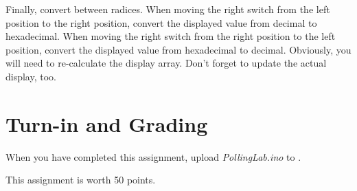 Finally, convert between radices. When moving the right switch from the left
position to the right position, convert the displayed value from decimal to
hexadecimal. When moving the right switch from the right position to the left
position, convert the displayed value from hexadecimal to decimal. Obviously,
you will need to re-calculate the display array. Don't forget to update the
actual display, too.

\section*{Turn-in and Grading}

When you have completed this assignment, upload \textit{PollingLab.ino} to
\filesubmission.

This assignment is worth 50 points. \\

